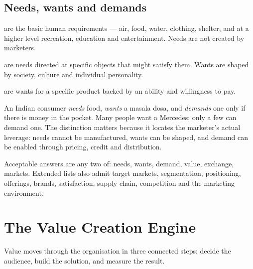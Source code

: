 \documentclass{MMTextbook}
\begin{document}
\subsection{Needs, wants and demands}

\begin{definitionbox}
 are the basic human requirements --- air, food, water,
clothing, shelter, and at a higher level recreation, education and
entertainment. Needs are not created by marketers.

 are needs directed at specific objects that might satisfy
them. Wants are shaped by society, culture and individual personality.

 are wants for a specific product backed by an ability and
willingness to pay.
\end{definitionbox}

An Indian consumer \emph{needs} food, \emph{wants} a masala dosa, and
\emph{demands} one only if there is money in the pocket. Many people want a
Mercedes; only a few can demand one. The distinction matters because it locates
the marketer's actual leverage: needs cannot be manufactured, wants can be
shaped, and demand can be enabled through pricing, credit and distribution.

\begin{exambox}
 Acceptable answers are any two of: needs,
wants, demand, value, exchange, markets. Extended lists also admit target
markets, segmentation, positioning, offerings, brands, satisfaction, supply
chain, competition and the marketing environment.
\end{exambox}

\section{The Value Creation Engine}

Value moves through the organisation in three connected steps: decide the
audience, build the solution, and measure the result.
\end{document}
